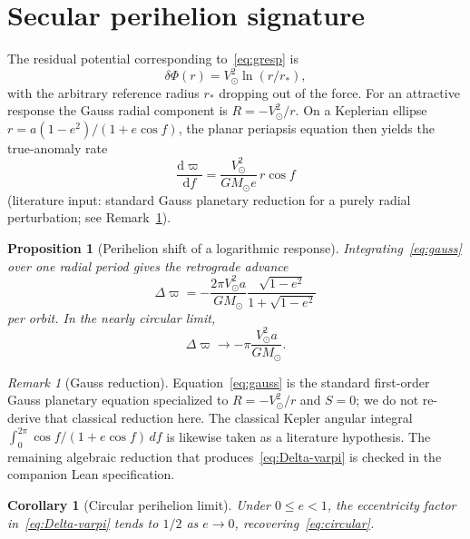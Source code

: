 \documentclass[11pt]{article}
\newtheorem{corollary}[theorem]{Corollary}
\newtheorem{proposition}[theorem]{Proposition}
\theoremstyle{definition}
\theoremstyle{remark}
\newtheorem{remark}[theorem]{Remark}
\newcommand{\dd}{\mathrm{d}}
\begin{document}
\section{Secular perihelion signature}
\label{sec:perihelion}
The residual potential corresponding to~\eqref{eq:gresp} is
\begin{equation}
\delta\Phi(r)=V_\odot^{2}\ln(r/r_{*}),
\end{equation}
with the arbitrary reference radius $r_{*}$ dropping out of the force.
For an attractive response the Gauss radial component is $R=-V_\odot^{2}/r$.
On a Keplerian ellipse $r=a(1-e^{2})/(1+e\cos f)$, the planar periapsis equation then yields the true-anomaly rate
\begin{equation}
\label{eq:gauss}
\frac{\dd\varpi}{\dd f}
=\frac{V_\odot^{2}}{GM_\odot e}\,r\cos f
\end{equation}
(literature input: standard Gauss planetary reduction for a purely radial perturbation; see Remark~\ref{rem:gauss}).

\begin{proposition}[Perihelion shift of a logarithmic response]
\label{prop:perihelion}
Integrating~\eqref{eq:gauss} over one radial period gives the retrograde advance
\begin{equation}
\label{eq:Delta-varpi}
\boxed{
\Delta\varpi
=-\frac{2\pi V_\odot^{2} a}{GM_\odot}
\frac{\sqrt{1-e^{2}}}{1+\sqrt{1-e^{2}}}
}
\end{equation}
per orbit.
In the nearly circular limit,
\begin{equation}
\label{eq:circular}
\Delta\varpi\to-\pi\frac{V_\odot^{2}a}{GM_\odot}.
\end{equation}
\end{proposition}

\begin{remark}[Gauss reduction]
\label{rem:gauss}
Equation~\eqref{eq:gauss} is the standard first-order Gauss planetary equation specialized to $R=-V_\odot^{2}/r$ and $S=0$; we do not re-derive that classical reduction here.
The classical Kepler angular integral
$\int_0^{2\pi}\cos f/(1+e\cos f)\,df$ is likewise taken as a literature hypothesis.
The remaining algebraic reduction that produces~\eqref{eq:Delta-varpi} is checked in the companion Lean specification.
\end{remark}

\begin{corollary}[Circular perihelion limit]
\label{cor:circular}
Under $0\le e<1$, the eccentricity factor in~\eqref{eq:Delta-varpi} tends to $1/2$ as $e\to0$, recovering~\eqref{eq:circular}.
\end{corollary}
\end{document}
